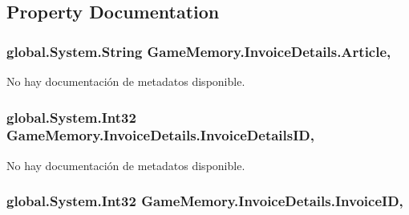 \subsection{Property Documentation}
\hypertarget{class_game_memory_1_1_invoice_details_abc5eef71cea2b1720b5b0179ddf6fbf8}{
\subsubsection[{Article}]{\setlength{\rightskip}{0pt plus 5cm}global.\-System.\-String Game\-Memory.\-Invoice\-Details.\-Article\hspace{0.3cm}{\ttfamily [get]}, {\ttfamily [set]}}}\label{class_game_memory_1_1_invoice_details_abc5eef71cea2b1720b5b0179ddf6fbf8}


No hay documentación de metadatos disponible. 

\hypertarget{class_game_memory_1_1_invoice_details_aca50c426114254633fd034bc5a64854d}{
\subsubsection[{Invoice\-Details\-I\-D}]{\setlength{\rightskip}{0pt plus 5cm}global.\-System.\-Int32 Game\-Memory.\-Invoice\-Details.\-Invoice\-Details\-I\-D\hspace{0.3cm}{\ttfamily [get]}, {\ttfamily [set]}}}\label{class_game_memory_1_1_invoice_details_aca50c426114254633fd034bc5a64854d}


No hay documentación de metadatos disponible. 

\hypertarget{class_game_memory_1_1_invoice_details_a67999662697ed10076327e47bba74611}{
\subsubsection[{Invoice\-I\-D}]{\setlength{\rightskip}{0pt plus 5cm}global.\-System.\-Int32 Game\-Memory.\-Invoice\-Details.\-Invoice\-I\-D\hspace{0.3cm}{\ttfamily [get]}, {\ttfamily [set]}}}\label{class_game_memory_1_1_invoice_details_a67999662697ed10076327e47bba74611}


